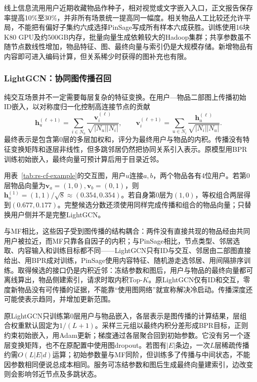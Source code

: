 线上信息流用用户近期收藏物品作种子，相对视觉或文字嵌入入口，正文报告保存率提高10\%至30\%，并非所有场景统一提高同一幅度。相关物品人工比较还允许平局，不能把有偏好子集约六成选择PinSage写成所有样本六成获胜。训练使用16块K80 GPU及约500GB内存，批量向量生成依赖较大的Hadoop集群；共享参数虽不随节点数线性增加，物品特征、图、最终向量与索引仍是大规模存储。新增物品有内容即可进入编码计算，但关系稀少时获得的图补充也有限。

\subsubsection{LightGCN：协同图传播召回}
\label{sec:rs-lightgcn}

纯交互场景并不一定需要每层复杂的特征变换。在用户—物品二部图上传播初始ID嵌入，以对称度归一化控制高连接节点的贡献
\begin{equation}
 \bm h_u^{(\ell+1)}
 =\sum_{i\in N_u}\frac{\bm v_i^{(\ell)}}{\sqrt{|N_u||N_i|}},
 \qquad
 \bm v_i^{(\ell+1)}
 =\sum_{u\in N_i}\frac{\bm h_u^{(\ell)}}{\sqrt{|N_i||N_u|}}.
 \label{eq:rs-lightgcn}
\end{equation}
最终表示是包含第0层的多层加权和，评分为最终用户与物品的内积。传播没有特征变换矩阵和逐层非线性，但多跳邻居仍然把协同关系引入表示。原模型用BPR训练初始嵌入，最终向量可预计算后用于目录近邻。

用表~\ref{tab:rs-cf-example}的交互图，用户$u$连接$a,b$，两个物品各有4位用户。若第0层物品向量为$\bm v_a=(1,0),\bm v_b=(0,1)$，则$\bm h_u^{(1)}=(1,1)/\sqrt8\approx(0.354,0.354)$。若自身第0层为$(1,0)$，等权组合两层得到$(0.677,0.177)$。完整候选分数还须使用同样完成传播和组合的物品向量；只替换用户侧并不是完整LightGCN。

与MF相比，这些因子受到图传播的结构耦合：两件没有直接共现的物品经由共同用户被拉近，而MF只靠各自因子的内积；与PinSage相比，节点类型、邻居选取、内容输入和训练目标都不同——LightGCN只有ID与交互、邻居由二部图直接给出、用BPR成对训练，PinSage使用内容特征、随机游走选邻居、用间隔排序训练。取得候选的接口仍是内积近邻：冻结参数和图后，用户与物品的最终向量都可离线算出，物品侧建索引，请求时取内积Top-$K$。原LightGCN仅有ID和交互，零度新物品没有可传播的证据，不能靠“使用图网络”就宣称解决冷启动。传播深度还可能使表示趋同，并增加更新范围。

原LightGCN只训练第0层用户与物品嵌入，各层表示是图传播的计算结果，层组合权重默认固定为$1/(L+1)$。采样三元组以最终内积分差形成BPR目标，正则约束初始嵌入，用Adam更新；梯度通过各层聚合回到初始参数。它没有另一个逐层变换矩阵，也不在原配置中使用图dropout。若图有$|E|$条边，一次$L$层稀疏传播约需$O(L|E|d)$运算；初始参数量与MF同阶，但训练多了传播与中间状态，不能因参数相同便说总成本相同。服务可冻结参数和图后生成最终向量建索引，边改变则会影响邻近节点及多跳状态。

